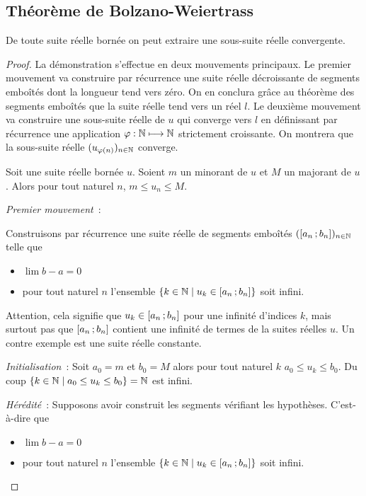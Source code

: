 \subsection{Théorème de Bolzano-Weiertrass}

\begin{theo}
  De toute suite réelle bornée on peut extraire une sous-suite réelle convergente.
\end{theo}
\begin{proof}
 La démonstration s'effectue en deux mouvements principaux. Le premier mouvement va construire par récurrence une suite réelle décroissante de segments emboîtés dont la longueur tend vers zéro. On en conclura grâce au théorème des segments emboîtés que la suite réelle tend vers un réel $l$. Le deuxième mouvement va construire une sous-suite réelle de $u$ qui converge vers $l$ en définissant par récurrence une application $\varphi : \mathbb{N} \longmapsto \mathbb{N}$ strictement croissante. On montrera que la sous-suite réelle $(u_{\varphi(n)})_{n \in \mathbb{N}}$ converge.

 Soit une suite réelle bornée $u$. Soient $m$ un minorant de $u$ et $M$ un majorant de $u$. Alors pour tout naturel $n$, $m \leq u_n \leq M$.

\emph{Premier mouvement}~:

Construisons par récurrence une suite réelle de segments emboîtés $(\left[ a_n \, ;  b_n \right])_{n \in \mathbb{N}}$ telle que
\begin{itemize}
\item $\lim b-a =0$
\item pour tout naturel $n$ l'ensemble $\left\{k \in \mathbb{N}\mathrel{}\middle|\mathrel{}u_k \in \left[ a_n \, ;  b_n \right]\right\}$ soit infini.
\end{itemize}

Attention, cela signifie que $u_k \in \left[ a_n \, ;  b_n \right]$ pour une infinité d'indices $k$, mais surtout pas que $\left[ a_n \, ;  b_n \right]$ contient une infinité de termes de la suites réelles $u$. Un contre exemple est une suite réelle constante.

\emph{Initialisation}~: Soit $a_0=m$ et $b_0=M$ alors pour tout naturel $k$ $a_0 \leq u_k \leq b_0$. Du coup $\left\{k \in \mathbb{N}\mathrel{}\middle|\mathrel{}a_0 \leq u_k \leq b_0\right\}=\mathbb{N}$ est infini.

\emph{Hérédité}~: Supposons avoir construit les segments vérifiant les hypothèses. C'est-à-dire que
\begin{itemize}
\item $\lim b-a =0$
\item pour tout naturel $n$ l'ensemble $\left\{k \in \mathbb{N}\mathrel{}\middle|\mathrel{}u_k \in \left[ a_n \, ;  b_n \right]\right\}$ soit infini.
\end{itemize}


\end{proof}
